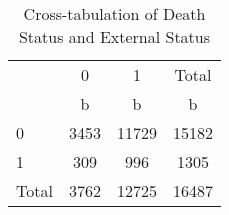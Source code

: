 \begin{table}[htbp]\centering
\def\sym#1{\ifmmode^{#1}\else\(^{#1}\)\fi}
\caption{Cross-tabulation of Death Status and External Status}
\begin{tabular}{l*{3}{c}}
\hline\hline
            &           0&           1&       Total\\
            &           b&           b&           b\\
\hline
0           &        3453&       11729&       15182\\
1           &         309&         996&        1305\\
Total       &        3762&       12725&       16487\\
\hline\hline
\end{tabular}
\end{table}
